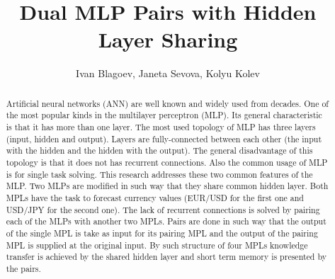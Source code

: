 \documentclass{llncs}
\begin{document}
\title{Dual MLP Pairs with Hidden Layer Sharing}

\author{Ivan Blagoev, Janeta Sevova, Kolyu Kolev}




\maketitle


\begin{abstract}

Artificial neural networks (ANN) are well known and widely used from decades. One of the most popular kinds in the multilayer perceptron (MLP). Its general characteristic is that it has more than one layer. The most used topology of MLP has three layers (input, hidden and output). Layers are fully-connected between each other (the input with the hidden and the hidden with the output). The general disadvantage of this topology is that it does not has recurrent connections. Also the common usage of MLP is for single task solving. This research addresses these two common features of the MLP. Two MLPs are modified in such way that they share common hidden layer. Both MPLs have the task to forecast currency values (EUR/USD for the first one and USD/JPY for the second one). The lack of recurrent connections is solved by pairing each of the MLPs with another two MPLs. Pairs are done in such way that the output of the single MPL is take as input for its pairing MPL and the output of the pairing MPL is supplied at the original input. By such structure of four MPLs knowledge transfer is achieved by the shared hidden layer and short term memory is presented by the pairs. 

\end{abstract}
\end{document}
